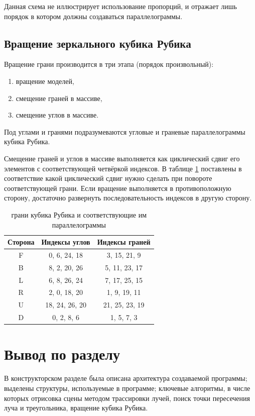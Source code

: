 \documentclass[a4paper, 14pt]{report}
\begin{document}
	Данная схема не иллюстрирует использование пропорций, и отражает лишь порядок в котором должны создаваться параллелограммы.
	
	\subsection{Вращение зеркального кубика Рубика}
	
	Вращение грани производится в три этапа (порядок произвольный):
	\begin{enumerate}
		\item вращение моделей,
		\item смещение граней в массиве,
		\item смещение углов в массиве.
	\end{enumerate}

	Под углами и гранями подразумеваются угловые и граневые параллелограммы кубика Рубика.
	
	Смещение граней и углов в массиве выполняется как циклический сдвиг его элементов с соответствующей четвёркой индексов. В таблице \ref{tabular:cube_indexes} поставлены в соответствие какой циклический сдвиг нужно сделать при повороте соответствующей грани. Если вращение выполняется в противоположную сторону, достаточно развернуть последовательность индексов в другую сторону.
	
	\begin{table}[!ht]
		\centering
		\caption{грани кубика Рубика и соответствующие им параллелограммы}
		\label{tabular:cube_indexes}
		\begin{tabular}{|c|c|c|}
			\hline
			Сторона & Индексы углов & Индексы граней \\
			\hline
			\hline
			F & 0, 6, 24, 18	& 3, 15, 21, 9		\\ \hline
			B & 8, 2, 20, 26	& 5, 11, 23, 17		\\ \hline
			L & 6, 8, 26, 24	& 7, 17, 25, 15		\\ \hline
			R & 2, 0, 18, 20	& 1, 9, 19, 11		\\ \hline
			U & 18, 24, 26, 20	& 21, 25, 23, 19	\\ \hline
			D & 0, 2, 8, 6		& 1, 5, 7, 3		\\ \hline
		\end{tabular}
	\end{table}
	
	\section{Вывод по разделу}
	В конструкторском разделе была описана архитектура создаваемой программы; выделены структуры, используемые в программе; ключевые алгоритмы, в числе которых отрисовка сцены методом трассировки лучей, поиск точки пересечения луча и треугольника, вращение кубика Рубика.
	
\end{document}
